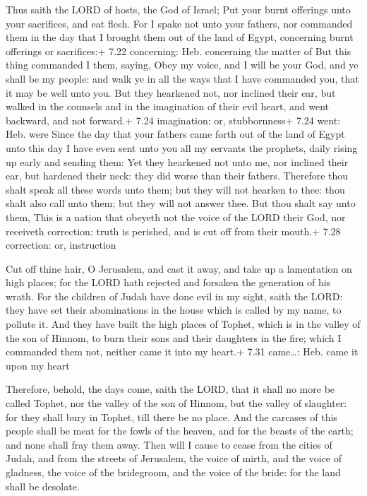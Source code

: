  Thus saith the LORD of hosts, the God of Israel; Put
your burnt offerings unto your sacrifices, and eat flesh. 
For I spake not unto your fathers, nor commanded them in the day that I
brought them out of the land of Egypt, concerning burnt offerings or
sacrifices:+ 7.22 concerning: Heb. concerning the matter of
 But this thing commanded I them, saying, Obey my voice,
and I will be your God, and ye shall be my people: and walk ye in all
the ways that I have commanded you, that it may be well unto you.
 But they hearkened not, nor inclined their ear, but walked
in the counsels and in the imagination of their evil heart, and went
backward, and not forward.+ 7.24 imagination: or, stubbornness+ 7.24
went: Heb. were  Since the day that your fathers came forth
out of the land of Egypt unto this day I have even sent unto you all my
servants the prophets, daily rising up early and sending them:
 Yet they hearkened not unto me, nor inclined their ear,
but hardened their neck: they did worse than their fathers.
 Therefore thou shalt speak all these words unto them; but
they will not hearken to thee: thou shalt also call unto them; but they
will not answer thee.  But thou shalt say unto them, This
is a nation that obeyeth not the voice of the LORD their God, nor
receiveth correction: truth is perished, and is cut off from their
mouth.+ 7.28 correction: or, instruction

 Cut off thine hair, O Jerusalem, and cast it away, and
take up a lamentation on high places; for the LORD hath rejected and
forsaken the generation of his wrath.  For the children of
Judah have done evil in my sight, saith the LORD: they have set their
abominations in the house which is called by my name, to pollute it.
 And they have built the high places of Tophet, which is in
the valley of the son of Hinnom, to burn their sons and their daughters
in the fire; which I commanded them not, neither came it into my heart.+
7.31 came\ldots: Heb. came it upon my heart

 Therefore, behold, the days come, saith the LORD, that
it shall no more be called Tophet, nor the valley of the son of Hinnom,
but the valley of slaughter: for they shall bury in Tophet, till there
be no place.  And the carcases of this people shall be meat
for the fowls of the heaven, and for the beasts of the earth; and none
shall fray them away.  Then will I cause to cease from the
cities of Judah, and from the streets of Jerusalem, the voice of mirth,
and the voice of gladness, the voice of the bridegroom, and the voice of
the bride: for the land shall be desolate.


